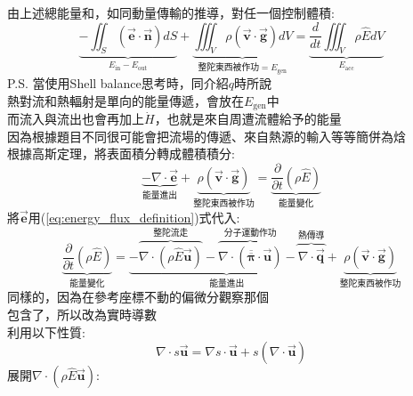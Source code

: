 \documentclass[../main.tex]{subfiles}
\begin{document}
\begin{itemize}
\begin{itemize}
        由上述總能量和，如同動量傳輸的推導，對任一個控制體積:
        \begin{equation}
          \underbrace{-\iint_S(\vec {\bm e}\cdot \vec{\bm n}) dS}_{E_{\text{in}}-E_{\text{out}}} 
          + \underbrace{\iiint_V \rho \left(\vec{\bm v} \cdot \vec{\bm g}\right)dV}_{\text{整陀東西被作功}=E_{\text{gen}}} 
          = \underbrace{\frac{d}{dt}\iiint_V \rho \hat E dV}_{E_\text{acc}}
        \end{equation}
        P.S. 當使用Shell balance思考時，同介紹$q$時所說\\
        熱對流和熱輻射是單向的能量傳遞，會放在$E_{\text{gen}}$中\\
        而流入與流出也會再加上$\dot H$，也就是來自周遭流體給予的能量\\
        因為根據題目不同很可能會把流場的傳遞、來自熱源的輸入等等簡併為焓\\
        根據高斯定理，將表面積分轉成體積積分:
        \begin{equation}
          \underbrace{- \nabla \cdot \vec{\bm e}}_{\text{能量進出}} + 
          \underbrace{\rho \left(\vec{\bm v} \cdot \vec{\bm g}\right)}_{\text{整陀東西被作功}} = 
          \underbrace{\frac{\partial}{\partial t} (\rho \hat E)}_{\text{能量變化}} 
        \end{equation}
        將$\vec{\bm e}$用(\ref{eq:energy_flux_definition})式代入:
        \begin{equation}
          \underbrace{\frac{\partial}{\partial t} (\rho \hat E)}_{\text{能量變化}} = \underbrace{- 
          \overbrace{\nabla \cdot \left(\rho \hat E \vec{\bm u}\right)}^{\text{整陀流走}}  - 
          \overbrace{\nabla \cdot \left(\overline{\overline{\bm \pi}} \cdot \vec{\bm u}\right)}^{\text{分子運動作功}} -
          \overbrace{\nabla \cdot \vec{\bm q}}^{\text{熱傳導}}
          }_{\text{能量進出}} + \underbrace{\rho \left(\vec{\bm v} \cdot \vec{\bm g}\right)}_{\text{整陀東西被作功}}
        \end{equation}
        同樣的，因為在參考座標不動的偏微分觀察那個\\
        包含了，所以改為實時導數\\
        利用以下性質:
        \begin{equation}
          \nabla \cdot s \vec{\bm u} = \nabla s \cdot \vec{\bm u} + s \left(\nabla \cdot \vec{\bm u}\right)
        \end{equation}
        展開$\nabla \cdot \left(\rho \hat E \vec{\bm u}\right)$:
        \begin{align}

\end{align}
\end{itemize}
\end{itemize}
\end{document}
